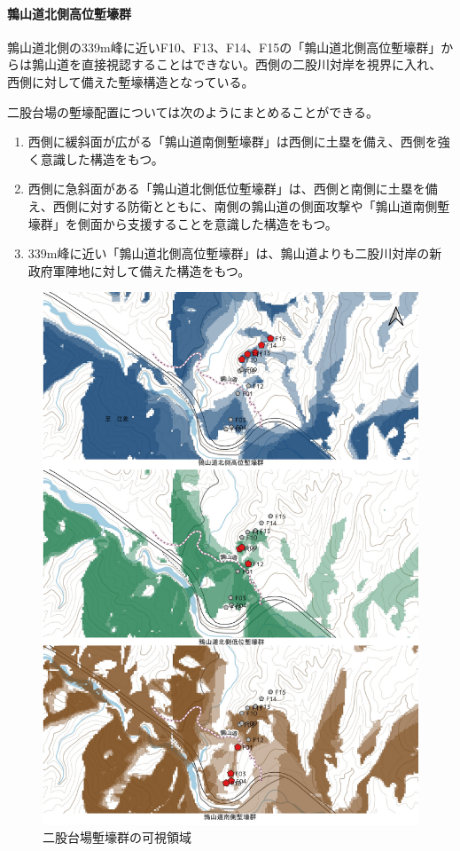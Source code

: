 \documentclass[14Q]{jsarticle}
\begin{document}
\paragraph{鶉山道北側高位塹壕群}
鶉山道北側の339m峰に近いF10、F13、F14、F15の「鶉山道北側高位塹壕群」からは鶉山道を直接視認することはできない。西側の二股川対岸を視界に入れ、西側に対して備えた塹壕構造となっている。

二股台場の塹壕配置については次のようにまとめることができる。

\begin{enumerate}
\item 西側に緩斜面が広がる「鶉山道南側塹壕群」は西側に土塁を備え、西側を強く意識した構造をもつ。
\item 西側に急斜面がある「鶉山道北側低位塹壕群」は、西側と南側に土塁を備え、西側に対する防衛とともに、南側の鶉山道の側面攻撃や「鶉山道南側塹壕群」を側面から支援することを意識した構造をもつ。
\item 339m峰に近い「鶉山道北側高位塹壕群」は、鶉山道よりも二股川対岸の新政府軍陣地に対して備えた構造をもつ。
\end{enumerate}

\begin{figure}[h]
\centering
\includegraphics[width=160truemm]{fig/view.pdf}
\caption{二股台場塹壕群の可視領域}
\label{view}
\end{figure}
\end{document}
